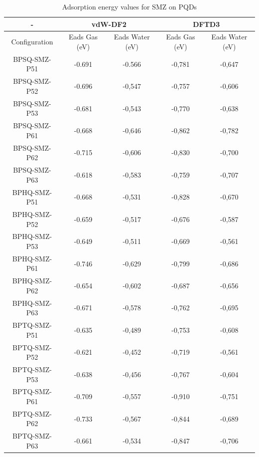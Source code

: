 \documentclass[preprint,12pt]{elsarticle}
\begin{document}
	\begin{table}[H]
		
		\begin{center}
			\caption{Adsorption energy values for SMZ on PQDs}
			\label{tab:all_configs}
			
			\begin{tabular}{| c | c | c | c | c |}
				\hline
				- & \multicolumn{2}{|c|}{vdW-DF2} & \multicolumn{2}{|c|}{DFTD3}  \\
				
				\hline
				Configuration & Eads Gas (eV) & Eads Water (eV) & Eads Gas (eV) & Eads Water (eV) \\
				\hline
				BPSQ-SMZ-P51&  -0.691 & -0.566 & -0,781 & -0,647\\
				BPSQ-SMZ-P52&  -0.696 & -0,547 & -0,757 & -0,606\\
				BPSQ-SMZ-P53&  -0.681 & -0,543 & -0,770 & -0,638\\
				BPSQ-SMZ-P61&  -0.668 & -0,646 & -0,862 & -0,782\\
				BPSQ-SMZ-P62&  -0.715 & -0,606 & -0,830 & -0,700\\
				BPSQ-SMZ-P63&  -0.618 & -0,583 & -0,759 & -0,707\\
				BPHQ-SMZ-P51&  -0.668 & -0,531 & -0,828 & -0,670\\
				BPHQ-SMZ-P52&  -0.659 & -0,517 & -0,676 & -0,587\\
				BPHQ-SMZ-P53&  -0.649 & -0,511 & -0,669 & -0,561\\
				BPHQ-SMZ-P61&  -0.746 & -0,629 & -0,799 & -0,686\\
				BPHQ-SMZ-P62&  -0.654 & -0,602 & -0,687 & -0,656\\
				BPHQ-SMZ-P63&  -0.671 & -0,578 & -0,762 & -0,695\\
				BPTQ-SMZ-P51&  -0.635 & -0,489 & -0,753 & -0,608\\
				BPTQ-SMZ-P52&  -0.621 & -0,452 & -0,719 & -0,561\\
				BPTQ-SMZ-P53&  -0.638 & -0,456 & -0,767 & -0,604\\
				BPTQ-SMZ-P61&  -0.709 & -0,557 & -0,910 & -0,751\\
				BPTQ-SMZ-P62&  -0.733 & -0,567 & -0,844 & -0,689\\
				BPTQ-SMZ-P63&  -0.661 & -0,534 & -0,847 & -0,706\\
				\hline
			\end{tabular}
			
		\end{center}
	\end{table}
	
\end{document}
